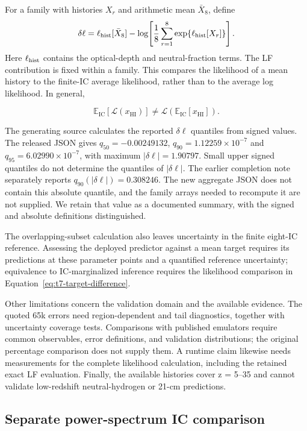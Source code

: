 For a family with histories $X_r$ and arithmetic mean $\bar X_8$, define
\begin{equation}
\delta\ell=\ell_{\rm hist}[\bar X_8]
-\log\!\left[\frac{1}{8}\sum_{r=1}^{8}\exp\{\ell_{\rm hist}[X_r]\}\right].
\label{eq:t7-target-difference}
\end{equation}
Here $\ell_{\rm hist}$ contains the optical-depth and neutral-fraction terms. The LF contribution is fixed within a family. This compares the likelihood of a mean history to the finite-IC average likelihood, rather than to the average log likelihood. In general,

\[
\mathbb{E}_{\mathrm{IC}}[\mathcal{L}(x_{\mathrm{HI}})]
\ne \mathcal{L}(\mathbb{E}_{\mathrm{IC}}[x_{\mathrm{HI}}]).
\]

The generating source calculates the reported $\delta\ell$ quantiles from signed values. The released JSON gives $q_{50}=-0.00249132$, $q_{90}=1.12259\times10^{-7}$ and $q_{95}=6.02990\times10^{-7}$, with maximum $|\delta\ell|=1.90797$. Small upper signed quantiles do not determine the quantiles of $|\delta\ell|$. The earlier completion note separately reports $q_{90}(|\delta\ell|)=0.308246$. The new aggregate JSON does not contain this absolute quantile, and the family arrays needed to recompute it are not supplied. We retain that value as a documented summary, with the signed and absolute definitions distinguished.

The overlapping-subset calculation also leaves uncertainty in the finite eight-IC reference. Assessing the deployed predictor against a mean target requires its predictions at these parameter points and a quantified reference uncertainty; equivalence to IC-marginalized inference requires the likelihood comparison in Equation~\ref{eq:t7-target-difference}.

Other limitations concern the validation domain and the available evidence. The quoted 65k errors need region-dependent and tail diagnostics, together with uncertainty coverage tests. Comparisons with published emulators require common observables, error definitions, and validation distributions; the original percentage comparison does not supply them. A runtime claim likewise needs measurements for the complete likelihood calculation, including the retained exact LF evaluation. Finally, the available histories cover z = 5--35 and cannot validate low-redshift neutral-hydrogen or 21-cm predictions.

\subsection{Separate power-spectrum IC comparison}


